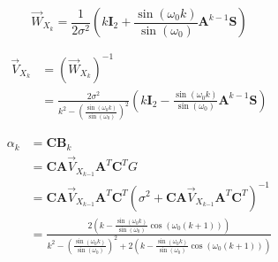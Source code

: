 \documentclass[11pt,a4paper,twoside]{report}
\newcommand{\messF}[3]{\overrightarrow{#1}_{{#2}_{k{#3}}}}
\newcommand{\mat}[1]{\mathbf{#1}}
\begin{document}
\begin{equation*}
	\messF{W}{X}{} = \frac{1}{2\sigma^2}\left(k\mat{I}_2 + \frac{\sin{\left(\omega_0k\right)}}{\sin{\left(\omega_0\right)}}\mat{A}^{k-1}\mat{S}\right)
\end{equation*}

\begin{align}
	\messF{V}{X}{} &= \left(\messF{W}{X}{}\right)^{-1} \\
	&= \frac{2\sigma^2}{k^2-\left(\frac{\sin{\left(\omega_0k\right)}}{\sin{\left(\omega_0\right)}}\right)^2}\left(k\mat{I}_2 - \frac{\sin{\left(\omega_0k\right)}}{\sin{\left(\omega_0\right)}}\mat{A}^{k-1}\mat{S}\right)
\end{align}

\begin{align}
	\alpha_k &= \mat{CB}_k \\
	&= \mat{C}\mat{A}\messF{V}{X}{-1}\mat{A}^T\mat{C}^TG \\
	&= \mat{C}\mat{A}\messF{V}{X}{-1}\mat{A}^T\mat{C}^T\left( \sigma^2 + \mat{C} \mat{A}\messF{V}{X}{-1} \mat{A}^T\mat{C}^T \right)^{-1} \\
	&= \frac{2\left(k-\frac{\sin{\left(\omega_0k\right)}}{\sin{\left(\omega_0\right)}}\cos{\left(\omega_0\left(k+1\right)\right)}\right)}{k^2-\left(\frac{\sin{\left(\omega_0k\right)}}{\sin{\left(\omega_0\right)}}\right)^2 + 2\left(k-\frac{\sin{\left(\omega_0k\right)}}{\sin{\left(\omega_0\right)}}\cos{\left(\omega_0\left(k+1\right)\right)}\right)}
\end{align}

\clearpage

%

\end{document}
